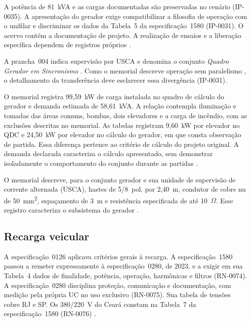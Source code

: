A potência de 81~kVA e as cargas documentadas são preservadas no cenário (IP-0035). A apresentação do gerador exige compatibilizar a filosofia de operação com o unifilar e discriminar os dados da Tabela~5 da especificação~1580 (IP-0031). O acervo contém a documentação de projeto. A realização de ensaios e a liberação específica dependem de registros próprios \cite[p.~9--11]{palatiummemorial2025}\cite[item~7.11.13 e tabela~5]{enel1580}.

A prancha~004 indica supervisão por USCA e denomina o conjunto \emph{Quadro Gerador em Sincronismo} \cite[prancha~004]{palatiumpranchas2025}. Como o memorial descreve operação sem paralelismo \cite[p.~9--11]{palatiummemorial2025}, o detalhamento da transferência deve esclarecer essa divergência (IP-0031).

O memorial registra 99,59~kW de carga instalada no quadro de cálculo do gerador e demanda estimada de 58,61~kVA. A relação contempla iluminação e tomadas das áreas comuns, bombas, dois elevadores e a carga de incêndio, com as exclusões descritas no memorial. As tabelas registram 9,60~kW por elevador no QDC e 24,50~kW por elevador no cálculo do gerador, em que consta observação de partida. Essa diferença pertence ao critério de cálculo do projeto original. A demanda declarada caracteriza o cálculo apresentado, sem demonstrar isoladamente o comportamento do conjunto durante as partidas \cite[p.~9--11]{palatiummemorial2025}.

O memorial descreve, para o conjunto gerador e sua unidade de supervisão de corrente alternada (USCA), hastes de 5/8~pol. por 2,40~m, condutor de cobre nu de 50~mm\textsuperscript{2}, espaçamento de 3~m e resistência especificada de até 10~\(\Omega\). Esse registro caracteriza o subsistema do gerador \cite{palatiummemorial2025}.

\subsection{Recarga veicular}

A especificação~0126 aplicava critérios gerais à recarga. A especificação~1580 passou a remeter expressamente à especificação~0280, de 2023, e a exigir em sua Tabela~4 dados de finalidade, potência, operação, harmônicas e filtros (RN-0074). A especificação~0280 disciplina proteção, comunicação e documentação, com medição pela própria UC no uso exclusivo (RN-0075). Sua tabela de tensões cobre RJ e SP. Os 380/220~V do Ceará constam na Tabela~7 da especificação~1580 (RN-0076) \cite[item~7.11.11 e Tabelas~4 e~7]{enel1580}\cite[Tabelas~1--2 e itens~7.1.5--7.1.12]{enel0280}.

